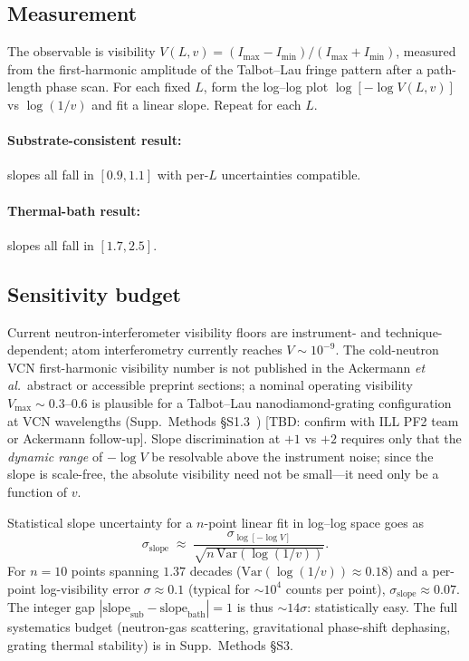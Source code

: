 \documentclass[aps,prl,twocolumn,superscriptaddress,nofootinbib,10pt]{revtex4-2}
\begin{document}
\subsection{Measurement}
The observable is visibility
$V(L,v) = (I_{\max} - I_{\min})/(I_{\max} + I_{\min})$,
measured from the first-harmonic amplitude of the Talbot--Lau fringe
pattern after a path-length phase scan. For each fixed $L$, form the
log--log plot $\log[-\log V(L,v)]$ vs $\log(1/v)$ and fit a linear
slope. Repeat for each $L$.

\paragraph*{Substrate-consistent result:} slopes all fall in
$[0.9, 1.1]$ with per-$L$ uncertainties compatible.
\paragraph*{Thermal-bath result:} slopes all fall in
$[1.7, 2.5]$.

\subsection{Sensitivity budget}
Current neutron-interferometer visibility floors are instrument- and
technique-dependent; atom interferometry currently reaches
$V \sim 10^{-9}$.  The cold-neutron VCN first-harmonic visibility
number is not published in the Ackermann \emph{et al.}\ abstract or
accessible preprint sections; a nominal operating visibility
$V_{\max} \sim 0.3$--$0.6$ is plausible for a Talbot--Lau
nanodiamond-grating configuration at VCN wavelengths
(Supp.~Methods \S S1.3~\cite{Alnitak2026Supp}) [TBD: confirm with
ILL PF2 team or Ackermann follow-up].  Slope discrimination at $+1$
vs $+2$ requires only that the \emph{dynamic range} of $-\log V$ be
resolvable above the instrument noise; since the slope is scale-free,
the absolute visibility need not be small---it need only be a
function of $v$.

Statistical slope uncertainty for a $n$-point linear fit in log--log
space goes as
\begin{equation}
  \sigma_{\mathrm{slope}} \;\approx\;
  \frac{\sigma_{\log[-\log V]}}{\sqrt{n\,\mathrm{Var}(\log(1/v))}}.
\end{equation}
For $n = 10$ points spanning $1.37$ decades
($\mathrm{Var}(\log(1/v)) \approx 0.18$) and a per-point log-visibility
error $\sigma \approx 0.1$ (typical for $\sim 10^{4}$ counts per
point), $\sigma_{\mathrm{slope}} \approx 0.07$.  The integer gap
$|\mathrm{slope}_{\mathrm{sub}} - \mathrm{slope}_{\mathrm{bath}}| = 1$
is thus $\sim 14\sigma$: statistically easy.  The full systematics
budget (neutron-gas scattering, gravitational phase-shift dephasing,
grating thermal stability) is in Supp.~Methods \S S3.
\end{document}
